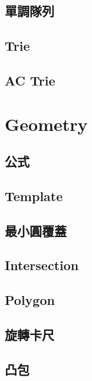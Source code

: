     \subsection{單調隊列}
         \columnbreak
    \subsection{Trie}
         \columnbreak
    \subsection{AC Trie}
        
\clearpage
        
\section{Geometry}
    \subsection{公式}
        
    \subsection{Template}
        
    \subsection{最小圓覆蓋}
        
    \columnbreak
    \subsection{Intersection}
        
    \subsection{Polygon}
        
    \columnbreak
    \subsection{旋轉卡尺}
        
    \subsection{凸包}
        
        
